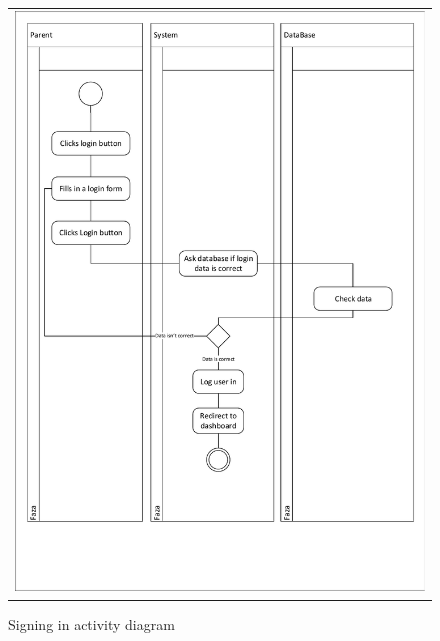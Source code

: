 \documentclass{sprawozdanie-agh}
\begin{document}
			\begin{figure}[H]
				\centering
				\begin{tabular}{c}
					\includegraphics[width=.95\textwidth]{Login_cropped} 
				\end{tabular}
			\caption{Signing in activity diagram}
			\end{figure}
\end{document}
